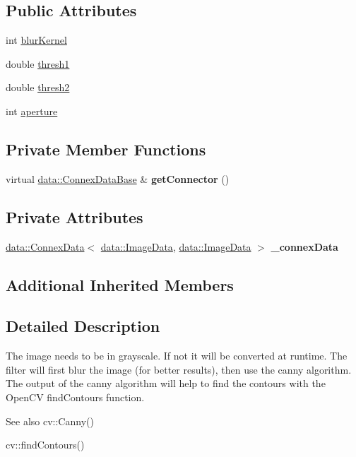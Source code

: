 \subsection*{Public Attributes}
\begin{DoxyCompactItemize}
\item 
int \hyperlink{classfilter_1_1_algos_1_1_canny_ab76f95b183fd0e59518b6f65b9345ad0}{blur\+Kernel}
\item 
double \hyperlink{classfilter_1_1_algos_1_1_canny_a7ca25f641a06d01a0467122fb22ad947}{thresh1}
\item 
double \hyperlink{classfilter_1_1_algos_1_1_canny_abccf54314a60ab802a99b47983436938}{thresh2}
\item 
int \hyperlink{classfilter_1_1_algos_1_1_canny_a73d61bdf0d7c6cd77af2b3d5b609cfc5}{aperture}
\end{DoxyCompactItemize}
\subsection*{Private Member Functions}
\begin{DoxyCompactItemize}
\item 
\mbox{\label{classfilter_1_1_algos_1_1_canny_a1c45ed066b15b77e2e44d5565d519591}} 
virtual \hyperlink{classfilter_1_1data_1_1_connex_data_base}{data\+::\+Connex\+Data\+Base} \& {\bfseries get\+Connector} ()
\end{DoxyCompactItemize}
\subsection*{Private Attributes}
\begin{DoxyCompactItemize}
\item 
\mbox{\label{classfilter_1_1_algos_1_1_canny_ae592fc78df0f5417418ec02b1a5dd763}} 
\hyperlink{classfilter_1_1data_1_1_connex_data}{data\+::\+Connex\+Data}$<$ \hyperlink{classfilter_1_1data_1_1_image_data}{data\+::\+Image\+Data}, \hyperlink{classfilter_1_1data_1_1_image_data}{data\+::\+Image\+Data} $>$ {\bfseries \+\_\+connex\+Data}
\end{DoxyCompactItemize}
\subsection*{Additional Inherited Members}


\subsection{Detailed Description}
The image needs to be in grayscale. If not it will be converted at runtime. The filter will first blur the image (for better results), then use the canny algorithm. The output of the canny algorithm will help to find the contours with the Open\+CV find\+Contours function. \begin{DoxySeeAlso}{See also}
cv\+::\+Canny() 

cv\+::find\+Contours() 
\end{DoxySeeAlso}


